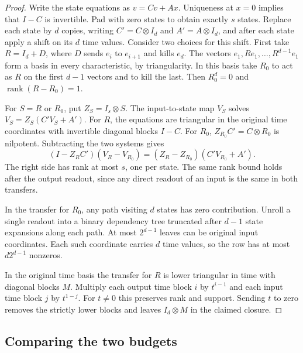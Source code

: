 \begin{proof}
Write the state equations as $v=Cv+Ax$. Uniqueness at $x=0$ implies
that $I-C$ is invertible. Pad with zero states to obtain exactly $s$
states. Replace each state by $d$ copies, writing $C'=C\otimes I_d$
and $A'=A\otimes I_d$, and after each state apply a shift on its
$d$ time values. Consider two choices for this shift. First take
$R=I_d+D$, where $D$ sends $e_i$ to $e_{i+1}$ and kills $e_d$.
The vectors $e_1,Re_1,\ldots,R^{d-1}e_1$ form a basis in every
characteristic, by triangularity. In this basis take $R_0$ to act as
$R$ on the first $d-1$ vectors and to kill the last. Then $R_0^d=0$
and $\operatorname{rank}(R-R_0)=1$.

For $S=R$ or $R_0$, put $Z_S=I_s\otimes S$. The input-to-state
map $V_S$ solves $V_S=Z_S(C'V_S+A')$. For $R$, the equations are
triangular in the original time coordinates with invertible diagonal
blocks $I-C$. For $R_0$, $Z_{R_0}C'=C\otimes R_0$ is nilpotent.
Subtracting the two systems gives
\[
 (I-Z_R C')(V_R-V_{R_0})
       =(Z_R-Z_{R_0})(C'V_{R_0}+A').
\]
The right side has rank at most $s$, one per state. The same rank
bound holds after the output readout, since any direct readout of an
input is the same in both transfers.

In the transfer for $R_0$, any path visiting $d$ states has zero
contribution. Unroll a single readout into a binary dependency tree
truncated after $d-1$ state expansions along each path. At most
$2^{d-1}$ leaves can be original input coordinates. Each such coordinate
carries $d$ time values, so the row has at most $d2^{d-1}$ nonzeros.

In the original time basis the transfer for $R$ is lower triangular
in time with diagonal blocks $M$. Multiply each output time block $i$
by $t^{i-1}$ and each input time block $j$ by $t^{1-j}$. For $t\ne0$
this preserves rank and support. Sending $t$ to zero removes the
strictly lower blocks and leaves $I_d\otimes M$ in the claimed closure.
\end{proof}

\subsection{Comparing the two budgets}

